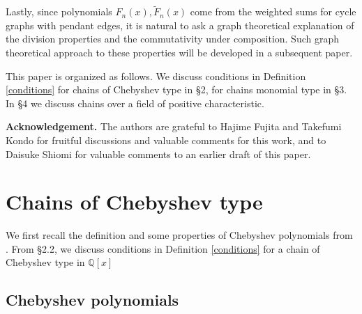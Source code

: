 \documentclass[a4paper, 11pt]{amsart}
\numberwithin{equation}{section}
\theoremstyle{definition}
\newcommand{\Q}{\mathbb{Q}}
\begin{document}
Lastly, since polynomials $F_n(x), \tilde{F}_n(x)$ come from the weighted sums for cycle graphs with pendant edges, it is natural to ask a graph theoretical explanation of the division properties and the commutativity under composition.
Such graph theoretical approach to these properties will be developed in a subsequent paper. 



\bigskip
This paper is organized as follows.
We discuss conditions in Definition \ref{conditions} for chains of Chebyshev type in \S2, for chains monomial type in \S3.
In \S4 we discuss chains over a field of positive characteristic.


\bigskip\noindent
\textbf{Acknowledgement.}
The authors are grateful to Hajime Fujita and Takefumi Kondo for fruitful discussions and valuable comments for this work, and to Daisuke Shiomi for valuable comments to an earlier draft of this paper.
 





\section{Chains of Chebyshev type}
We first recall the definition and some properties of Chebyshev polynomials from \cite{RTW}.
From \S2.2, we discuss conditions in Definition \ref{conditions} for a chain of Chebyshev type in $\Q[x]$




\subsection{Chebyshev polynomials}
\end{document}
